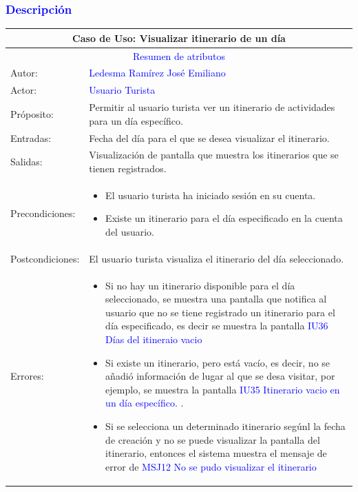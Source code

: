 \subsubsection{\textcolor{blue}{Descripción}}
\begin{tabularx}{16cm}{||l|X||}
	\hline
	\multicolumn{2}{||c||}{\textbf{Caso de Uso: Visualizar itinerario de un día}} \\
	\hline
	\multicolumn{2}{||c||}{\textcolor{blue}{Resumen de atributos}} \\
 \hline
	{Autor:} & {\textcolor{blue}{Ledesma Ramírez José Emiliano}} \\
	\hline
	\hline
	{Actor:} & {\textcolor{blue}{Usuario Turista}} \\
	\hline     
	{Próposito:} & Permitir al usuario turista ver un itinerario de actividades para un día específico.\\
	\hline
	{Entradas:} & Fecha del día para el que se desea visualizar el itinerario.\\
	\hline
	{Salidas:} & Visualización de pantalla que muestra los itinerarios que se tienen registrados.\\
	\hline
	{Precondiciones:} & 
        \begin{itemize}
            \item El usuario turista ha iniciado sesión en su cuenta.
            \item Existe un itinerario para el día especificado en la cuenta del usuario.
        \end{itemize}\\
	\hline
	{Postcondiciones:} & El usuario turista visualiza el itinerario del día seleccionado.\\
	\hline
	{Errores:} & 
    {\begin{itemize}
            \item  Si no hay un itinerario disponible para el día seleccionado, se muestra una pantalla que notifica al usuario que no se tiene registrado un itinerario para el día especificado, es decir se muestra la pantalla {\textcolor{blue}{IU36 Días del itineraio vacio}}
            \item  Si existe un itinerario, pero está vacío, es decir, no se añadió información de lugar al que se desa visitar, por ejemplo, se muestra la pantalla {\textcolor{blue}{IU35 Itinerario vacio en un día específico}}. .
            \item Si se selecciona un determinado itinerario segúnl la fecha de creación y no se puede visualizar la pantalla del itinerario, entonces el sistema muestra el mensaje de error de {\textcolor{blue}{MSJ12 No se pudo visualizar el itinerario}}

\end{itemize}}
\end{tabularx}

